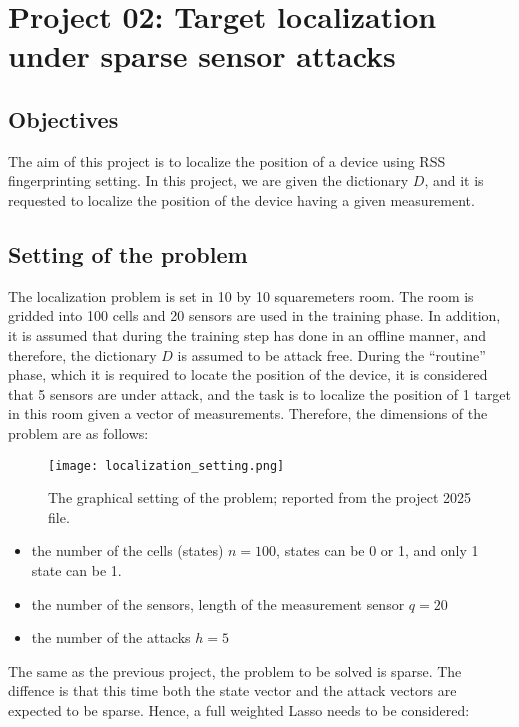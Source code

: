 \chapter{Project 02: Target localization under sparse sensor attacks}

\section{Objectives}
The aim of this project is to localize the position of a device using RSS fingerprinting setting. In this project, we are given the dictionary $D$, and it is requested to localize the position of the device having a given measurement.

\section{Setting of the problem}
The localization problem is set in 10 by 10 squaremeters room. The room is gridded into 100 cells and 20 sensors are used in the training phase. In addition, it is assumed that during the training step has done in an offline manner, and therefore, the dictionary $D$ is assumed to be attack free. During the ``routine'' phase, which it is required to locate the position of the device, it is considered that 5 sensors are under attack, and the task is to localize the position of 1 target in this room given a vector of measurements. Therefore, the dimensions of the problem are as follows:
\begin{figure}[H] %
    \centering
    \texttt{[image: localization\_setting.png]} %
    \caption{The graphical setting of the problem; reported from the project 2025 file.}
\end{figure}
\begin{itemize}
	\item the number of the cells (states) $n = 100$,  states can be 0 or 1, and only 1 state can be 1.
	\item the number of the sensors, length of the measurement sensor $q = 20$
	\item the number of the attacks $h = 5$
\end{itemize}

The same as the previous project, the problem to be solved is sparse. The diffence is that this time both the state vector and the attack vectors are expected to be sparse. Hence, a full weighted Lasso needs to be considered:

